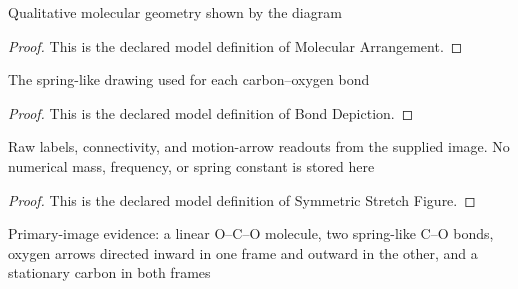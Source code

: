 \begin{definition}
  \label{def:physics:phyx-mini-0207:phyxminiproblems-problemphyxmini0207-moleculararrangement}
  Qualitative molecular geometry shown by the diagram
\end{definition}
\begin{proof}
  This is the declared model definition of Molecular Arrangement.
\end{proof}
\begin{definition}
  \label{def:physics:phyx-mini-0207:phyxminiproblems-problemphyxmini0207-bonddepiction}
  The spring-like drawing used for each carbon--oxygen bond
\end{definition}
\begin{proof}
  This is the declared model definition of Bond Depiction.
\end{proof}
\begin{definition}
  \label{def:physics:phyx-mini-0207:phyxminiproblems-problemphyxmini0207-symmetricstretchfigure}
  Raw labels, connectivity, and motion-arrow readouts from the supplied image. No numerical mass, frequency, or spring constant is stored here
\end{definition}
\begin{proof}
  This is the declared model definition of Symmetric Stretch Figure.
\end{proof}
\begin{definition}
  \label{def:physics:phyx-mini-0207:phyxminiproblems-problemphyxmini0207-matchessuppliedfigure}
  Primary-image evidence: a linear O--C--O molecule, two spring-like C--O bonds, oxygen arrows directed inward in one frame and outward in the other, and a stationary carbon in both frames
\end{definition}
